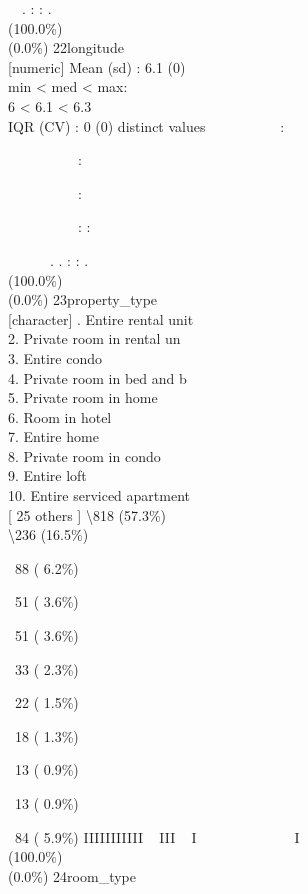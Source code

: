 \documentclass[
  journal,
]{IEEEtran}%
\begin{document}
\strut ~~. : : . \\
(100.0\%) \\
(0.0\%) \textbar{} \textbar{} 22\textbar longitude\\
{[}numeric{]} \textbar Mean (sd) : 6.1 (0)\\
min \textless{} med \textless{} max:\\
6 \textless{} 6.1 \textless{} 6.3\\
IQR (CV) : 0 (0)  distinct values \textbar{}
\textbar~~~~~~~~~~:\\
\strut ~~~~~~~~~~:\\
\strut ~~~~~~~~~~:\\
\strut ~~~~~~~~~~: :\\
\strut ~~~~~~. . : : . \\
(100.0\%) \\
(0.0\%) \textbar{} \textbar{} 23\textbar property\_type\\
{[}character{]} . Entire rental unit\\
2. Private room in rental un\\
3. Entire condo\\
4. Private room in bed and b\\
5. Private room in home\\
6. Room in hotel\\
7. Entire home\\
8. Private room in condo\\
9. Entire loft\\
10. Entire serviced apartment\\
{[} 25 others {]} \textbar\textbackslash818 (57.3\%)\\
\textbackslash236 (16.5\%)\\
\strut ~88 ( 6.2\%)\\
\strut ~51 ( 3.6\%)\\
\strut ~51 ( 3.6\%)\\
\strut ~33 ( 2.3\%)\\
\strut ~22 ( 1.5\%)\\
\strut ~18 ( 1.3\%)\\
\strut ~13 ( 0.9\%)\\
\strut ~13 ( 0.9\%)\\
\strut ~84 ( 5.9\%) \textbar{} \textbar IIIIIIIIIII ~ III ~ I ~ ~ ~ ~ ~
~ ~ ~ I \\
(100.0\%) \\
(0.0\%) \textbar{} \textbar{} 24\textbar room\_type\\
\end{document}
